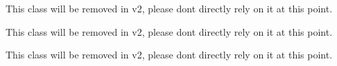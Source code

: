 
\begin{DoxyRefList}
\item[\label{deprecated__deprecated000001}%
\hypertarget{deprecated__deprecated000001}{}%
Class \hyperlink{interface_g_f_line_string_abstract}{G\+F\+Line\+String\+Abstract} ]This class will be removed in v2, please don\textquotesingle{}t directly rely on it at this point. 
\item[\label{deprecated__deprecated000002}%
\hypertarget{deprecated__deprecated000002}{}%
Class \hyperlink{interface_g_f_point_abstract}{G\+F\+Point\+Abstract} ]This class will be removed in v2, please don\textquotesingle{}t directly rely on it at this point. 
\item[\label{deprecated__deprecated000003}%
\hypertarget{deprecated__deprecated000003}{}%
Class \hyperlink{interface_g_f_polygon_abstract}{G\+F\+Polygon\+Abstract} ]This class will be removed in v2, please don\textquotesingle{}t directly rely on it at this point.
\end{DoxyRefList}